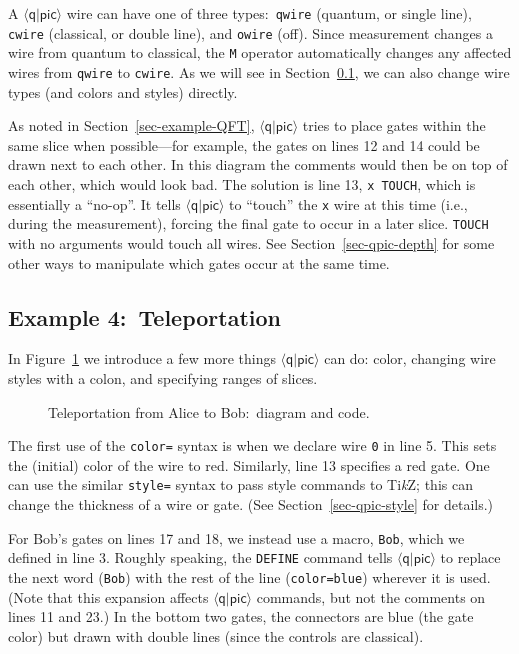 \documentclass[twoside,12pt]{article}
\newcommand{\qpic}{$\langle\mathsf{q}|\mathsf{pic}\rangle$\xspace}
\newcommand{\TikZ}{Ti\emph{k}Z\xspace}
\begin{document}
A \qpic wire can have one of three types:\ {\tt qwire} (quantum, or single line),
{\tt cwire} (classical, or double line), and {\tt owire} (off).
Since measurement changes a wire from quantum to classical, the {\tt M}
operator automatically changes any affected wires from {\tt qwire} to
{\tt cwire}.  As we will see in Section~\ref{sec-example-teleport},
we can also change wire types (and colors and styles) directly.


As noted in Section~\ref{sec-example-QFT}, \qpic tries to place gates
within the same slice when possible---for example, the gates on
lines 12 and 14 could be drawn next to each other.  In this diagram
the comments would then be on top of each other, which would look bad.
The solution is line 13, {\tt x TOUCH}, which is essentially a
``no-op''.  It tells \qpic to ``touch''
the {\tt x} wire at this time (i.e., during the measurement), forcing
the final gate to occur in a later slice.  {\tt TOUCH} with no
arguments would touch all wires.  See Section~\ref{sec-qpic-depth} for
some other ways to manipulate which gates occur at the same time.

\subsection{Example 4:\ Teleportation}
\label{sec-example-teleport}

In Figure~\ref{fig-teleport} we introduce a few more things \qpic can do: color, changing wire styles with a colon, and specifying ranges of slices.

\begin{figure}[h!] 
\begin{center}

\begin{minipage}{5in}

\end{minipage}
\end{center}
\caption{Teleportation from {\color{red}Alice} to {\color{blue}Bob}:\ diagram and code.}
\label{fig-teleport}
\end{figure}

The first use of the {\tt color=} syntax is when we declare wire {\tt 0}
in line 5.  This sets the (initial) color of the wire to red.
Similarly, line 13 specifies a red gate.  One can use the similar {\tt style=}
syntax to pass style commands to \TikZ; this can change the
thickness of a wire or gate.  (See Section~\ref{sec-qpic-style} for details.)

For Bob's gates on lines 17 and 18, we instead use a macro, {\tt Bob},
which we defined in line 3.  Roughly speaking, the
{\tt DEFINE} command tells \qpic to replace the next word ({\tt Bob})
with the rest of the line ({\tt color=blue}) wherever it is used.  (Note that
this expansion affects \qpic commands, but not the comments on lines 11 and 23.)
In the bottom two gates, the connectors are blue (the gate color) but drawn
with double lines (since the controls are classical).
\end{document}
